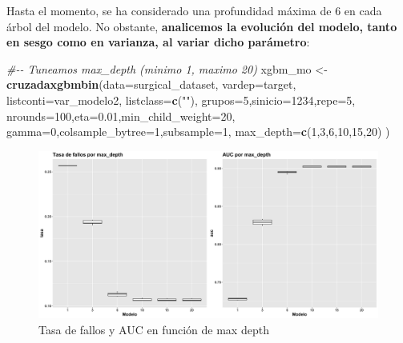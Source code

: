\documentclass[
]{article}
\newenvironment{Shaded}{\begin{snugshade}}{\end{snugshade}}
\newcommand{\CommentTok}[1]{\textcolor[rgb]{0.56,0.35,0.01}{\textit{#1}}}
\newcommand{\DataTypeTok}[1]{\textcolor[rgb]{0.13,0.29,0.53}{#1}}
\newcommand{\DecValTok}[1]{\textcolor[rgb]{0.00,0.00,0.81}{#1}}
\newcommand{\FloatTok}[1]{\textcolor[rgb]{0.00,0.00,0.81}{#1}}
\newcommand{\KeywordTok}[1]{\textcolor[rgb]{0.13,0.29,0.53}{\textbf{#1}}}
\newcommand{\NormalTok}[1]{#1}
\newcommand{\StringTok}[1]{\textcolor[rgb]{0.31,0.60,0.02}{#1}}
\begin{document}
Hasta el momento, se ha considerado una profundidad máxima de 6 en cada
árbol del modelo. No obstante, \textbf{analicemos la evolución del
modelo, tanto en sesgo como en varianza, al variar dicho parámetro}:

\begin{Shaded}
\begin{Highlighting}[]
\CommentTok{\#{-}{-} Tuneamos max\_depth (minimo 1, maximo 20)}
\NormalTok{xgbm\_mo <{-}}\StringTok{ }\KeywordTok{cruzadaxgbmbin}\NormalTok{(}\DataTypeTok{data=}\NormalTok{surgical\_dataset, }\DataTypeTok{vardep=}\NormalTok{target,}
                            \DataTypeTok{listconti=}\NormalTok{var\_modelo2, }\DataTypeTok{listclass=}\KeywordTok{c}\NormalTok{(}\StringTok{""}\NormalTok{), }
                            \DataTypeTok{grupos=}\DecValTok{5}\NormalTok{,}\DataTypeTok{sinicio=}\DecValTok{1234}\NormalTok{,}\DataTypeTok{repe=}\DecValTok{5}\NormalTok{,}
                            \DataTypeTok{nrounds=}\DecValTok{100}\NormalTok{,}\DataTypeTok{eta=}\FloatTok{0.01}\NormalTok{,}\DataTypeTok{min\_child\_weight=}\DecValTok{20}\NormalTok{,}
                            \DataTypeTok{gamma=}\DecValTok{0}\NormalTok{,}\DataTypeTok{colsample\_bytree=}\DecValTok{1}\NormalTok{,}\DataTypeTok{subsample=}\DecValTok{1}\NormalTok{,}
                            \DataTypeTok{max\_depth=}\KeywordTok{c}\NormalTok{(}\DecValTok{1}\NormalTok{,}\DecValTok{3}\NormalTok{,}\DecValTok{6}\NormalTok{,}\DecValTok{10}\NormalTok{,}\DecValTok{15}\NormalTok{,}\DecValTok{20}\NormalTok{)}
\NormalTok{                        )}
\end{Highlighting}
\end{Shaded}

\begin{figure}[h!]

{\centering \includegraphics[width=0.99\linewidth,height=0.99\textheight,]{./charts/xgboost/max_depth} 

}

\caption{Tasa de fallos y AUC en función de max depth}\label{fig:unnamed-chunk-134}
\end{figure}
\end{document}

